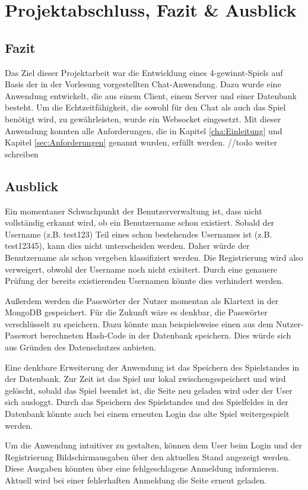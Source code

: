 
\chapter{Projektabschluss, Fazit \& Ausblick}\label{cha:Schlussbetrachtung}
\section{Fazit}\label{sec:Fazit}
Das Ziel dieser Projektarbeit war die Entwicklung eines 4-gewinnt-Spiels auf Basis der in der Vorlesung vorgestellten Chat-Anwendung. Dazu wurde eine Anwendung entwickelt, die aus einem Client, einem Server und einer Datenbank besteht. Um die Echtzeitfähigkeit, die sowohl für den Chat als auch das Spiel benötigt wird, zu gewährleisten, wurde ein Websocket eingesetzt. Mit dieser Anwendung konnten alle Anforderungen, die in Kapitel \ref{cha:Einleitung} und Kapitel \ref{sec:Anforderungen} genannt wurden, erfüllt werden. //todo weiter schreiben

\section{Ausblick}\label{sec:Ausblick}
Ein momentaner Schwachpunkt der Benutzerverwaltung ist, dass nicht vollständig erkannt wird, ob ein Benutzername schon existiert. Sobald der Username (z.B. test123) Teil eines schon bestehendes Usernames ist (z.B. test12345), kann dies nicht unterscheiden werden. Daher würde der Benutzername als schon vergeben klassifiziert werden. Die Registrierung wird also verweigert, obwohl der Username noch nicht exisitert. Durch eine genauere Prüfung der bereits existierenden Usernamen könnte dies verhindert werden.

Außerdem werden die Passwörter der Nutzer momentan als Klartext in der MongoDB gespeichert. Für die Zukunft wäre es denkbar, die Passwörter verschlüsselt zu speichern. Dazu könnte man beispielsweise einen aus dem Nutzer-Passwort berechneten Hash-Code in der Datenbank speichern. Dies würde sich aus Gründen des Datenschutzes anbieten.

Eine denkbare Erweiterung der Anwendung ist das Speichern des Spielstandes in der Datenbank. Zur Zeit ist das Spiel nur lokal zwischengespeichert und wird gelöscht, sobald das Spiel beendet ist, die Seite neu geladen wird oder der User sich ausloggt. Durch das Speichern des Spielstandes und des Spielfeldes in der Datenbank könnte auch bei einem erneuten Login das alte Spiel weitergespielt werden.

Um die Anwendung intuitiver zu gestalten, können dem User beim Login und der Registrierung Bildschirmausgaben über den aktuellen Stand angezeigt werden. Diese Ausgaben könnten über eine fehlgeschlagene Anmeldung informieren. Aktuell wird bei einer fehlerhaften Anmeldung die Seite erneut geladen. 
